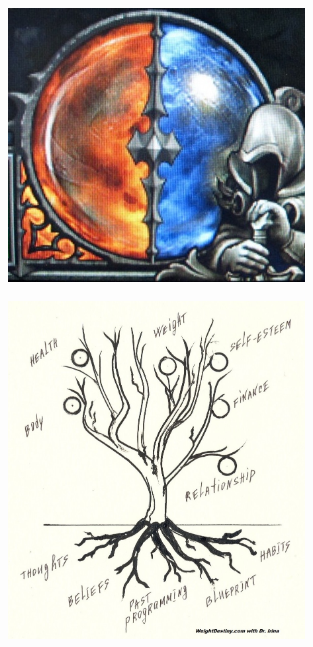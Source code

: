 \documentclass{simple}
\begin{document}
\begin{frame}{}
  \begin{figure}
    \centering
    \includegraphics[width=0.7\textwidth]{img/hatred-discipline}
  \end{figure}
\end{frame}

\begin{frame}{}
  \begin{figure}
    \centering
    \includegraphics[width=0.7\textwidth]{img/life-tree}
  \end{figure}
\end{frame}
\end{document}

